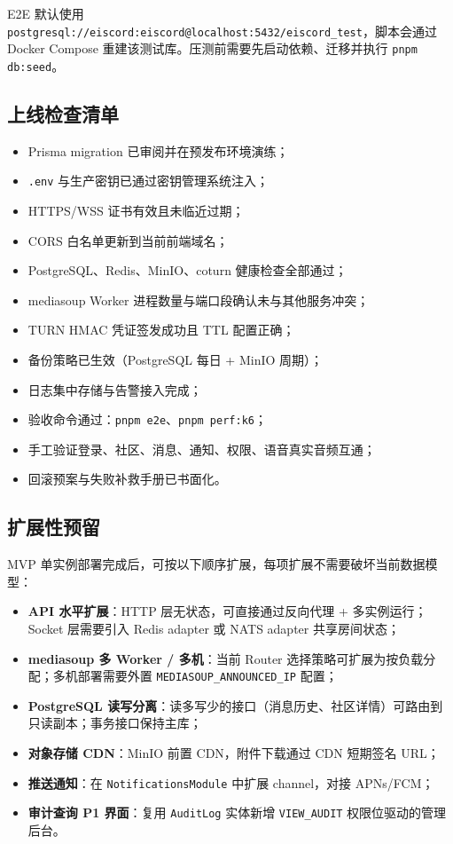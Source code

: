 E2E 默认使用 \texttt{postgresql://eiscord:eiscord@localhost:5432/eiscord\_test}，脚本会通过 Docker Compose 重建该测试库。压测前需要先启动依赖、迁移并执行 \texttt{pnpm db:seed}。

\subsection{上线检查清单}

\begin{itemize}
  \item[$\square$] Prisma migration 已审阅并在预发布环境演练；
  \item[$\square$] \texttt{.env} 与生产密钥已通过密钥管理系统注入；
  \item[$\square$] HTTPS/WSS 证书有效且未临近过期；
  \item[$\square$] CORS 白名单更新到当前前端域名；
  \item[$\square$] PostgreSQL、Redis、MinIO、coturn 健康检查全部通过；
  \item[$\square$] mediasoup Worker 进程数量与端口段确认未与其他服务冲突；
  \item[$\square$] TURN HMAC 凭证签发成功且 TTL 配置正确；
  \item[$\square$] 备份策略已生效（PostgreSQL 每日 + MinIO 周期）；
  \item[$\square$] 日志集中存储与告警接入完成；
  \item[$\square$] 验收命令通过：\texttt{pnpm e2e}、\texttt{pnpm perf:k6}；
  \item[$\square$] 手工验证登录、社区、消息、通知、权限、语音真实音频互通；
  \item[$\square$] 回滚预案与失败补救手册已书面化。
\end{itemize}

\subsection{扩展性预留}

MVP 单实例部署完成后，可按以下顺序扩展，每项扩展不需要破坏当前数据模型：

\begin{itemize}
  \item \textbf{API 水平扩展}：HTTP 层无状态，可直接通过反向代理 + 多实例运行；Socket 层需要引入 Redis adapter 或 NATS adapter 共享房间状态；
  \item \textbf{mediasoup 多 Worker / 多机}：当前 Router 选择策略可扩展为按负载分配；多机部署需要外置 \texttt{MEDIASOUP\_ANNOUNCED\_IP} 配置；
  \item \textbf{PostgreSQL 读写分离}：读多写少的接口（消息历史、社区详情）可路由到只读副本；事务接口保持主库；
  \item \textbf{对象存储 CDN}：MinIO 前置 CDN，附件下载通过 CDN 短期签名 URL；
  \item \textbf{推送通知}：在 \texttt{NotificationsModule} 中扩展 channel，对接 APNs/FCM；
  \item \textbf{审计查询 P1 界面}：复用 \texttt{AuditLog} 实体新增 \texttt{VIEW\_AUDIT} 权限位驱动的管理后台。
\end{itemize}

